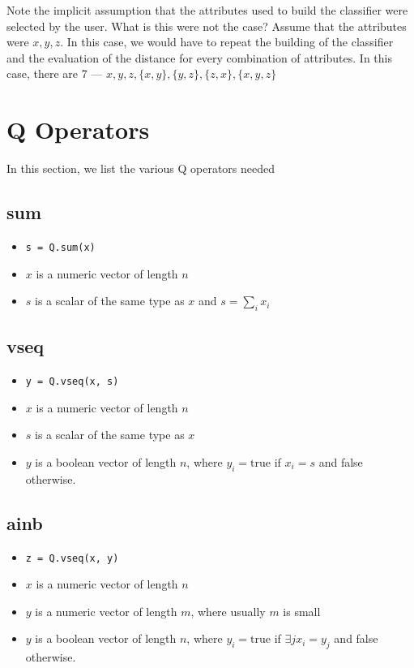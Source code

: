 Note the implicit assumption that the attributes used to build 
the classifier were selected by the user. What is this were not the case? Assume
that the attributes were \(x, y, z\). In this case, we would have to repeat the
building of the classifier and the evaluation of the distance for every
combination of attributes. In this case, there are 7 
--- \(x, y, z, \{x, y\}, \{y, z\}, \{z, x\}, \{x, y, z\}\)


\section{Q Operators}

In this section, we list the various Q operators needed

\subsection{sum}
\label{sum}

\begin{itemize}
\item \verb+s = Q.sum(x)+ 
\item \(x\) is a numeric vector of length \(n\)
\item \(s\) is a scalar of the same type as \(x\) and \(s = \sum_i x_i\)
\end{itemize}

\subsection{vseq}
\label{vseq}

\begin{itemize}
\item \verb+y = Q.vseq(x, s)+ 
\item \(x\) is a numeric vector of length \(n\)
\item \(s\) is a scalar of the same type as \(x\)
\item \(y\) is a boolean vector of length \(n\), where \(y_i = \mathrm{true}\)
if \(x_i = s\) and false otherwise.
\end{itemize}

\subsection{ainb}
\label{ainb}

\begin{itemize}
\item \verb+z = Q.vseq(x, y)+ 
\item \(x\) is a numeric vector of length \(n\)
\item \(y\) is a numeric vector of length \(m\), where usually \(m\) is small
\item \(y\) is a boolean vector of length \(n\), where \(y_i = \mathrm{true}\)
if \(\exists j x_i = y_j\) and false otherwise.
\end{itemize}


